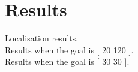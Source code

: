 \section{Results}
Localisation results.\\

Results when the goal is [ 20 120 ].\\

Results when the goal is [ 30 30 ].\\



